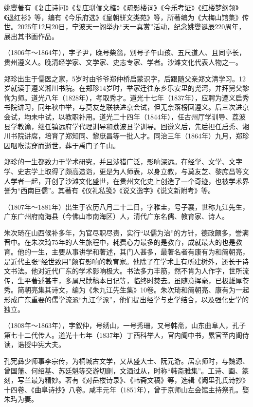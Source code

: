 \begin{description}
        姚燮著有《复庄诗问》《复庄骈俪文榷》《疏影楼词》《今乐考证》《红楼梦纲领》《退红衫》等，编有《今乐府选》《皇朝骈文类苑》等，所著编为《大梅山馆集》传世。2025年12月20日，宁波天一阁举办“天一真赏”活动，纪念姚燮诞辰220周年，展出其书画作品。
  \item[郑珍] （1806年～1864年），字子尹，晚号柴翁，别号子午山孩、五尺道人、且同亭长，贵州遵义人。晚清经学家、文学家、史志专家、学者。沙滩文化代表人物之一。\par
        郑珍出生于儒医之家，5岁时由爷爷郑仲桥启蒙识字，后跟随父亲郑文清学习。12岁就读于遵义湘川书院。在郑珍14岁时，举家迁往东乡乐安里的尧湾，并拜舅父黎恂为师。道光八年（1828年），考取秀才。道光十七年（1837年），应聘为遵义启秀书院讲习，同年秋中举，与莫友芝联袂进京会试，但无奈落榜回遵义。后三次进京会试，均未中试，以教职补用。道光二十四年（1844年），任古州厅学训导、荔波县学教谕，继任镇远府学代理训导和荔波县学训导。回遵义后，先后担任启秀、湘川书院讲席，培育了郑知同、黎庶昌等一批人才。同治三年（1864年）九月，郑珍因咽喉溃穿而逝世，葬于禹门子午山。\par
        郑珍的一生都致力于学术研究，并且涉猎广泛，影响深远。在经学、文学、文字学、史志学上取得了颇高造诣，更是为人师表，以身立教，与莫友芝、黎庶昌等文人学者一起，开创了沙滩文化盛世，在贵州文化史上创造了一个奇迹，也被学术界誉为“西南巨儒”。其著有《仪礼私笺》《说文逸字》《说文新附考》等。
  \item[朱次琦] （1807年～1881年）出生于农历八月二十二日，字稚圭，号子襄，世称九江先生，广东广州府南海县（今佛山市南海区）人，清代广东名儒、教育家、诗人。\par
        朱次琦在山西候补多年，为官尽职尽责，实行“以儒为治”的方针，德政颇多，誉满晋中。在朱次琦75年的人生旅程中，耗费心力最多的是教育，成就最大的也是教育。他的一生，主要从事讲学和著述，其门人甚多，最著名者有康有为和简朝亮，是近代主张“经世致用”颇有影响的教育家。他除了在学术上有所建树外，还长于诗文书法。他对近代广东的学术影响极大。书法多力丰筋，然不肯为人作字，世所流传，生平著述甚丰，多属尺牍稿本日记等，临终时焚去。虽随意挥毫，已极雄厚苍秀。简朝亮集其诗文，编为《朱九江先生集》10卷。朱次琦和简朝亮、康有为一起形成广东重要的儒学流派“九江学派”，他们提出经学与史学结合，以及强化史学的独立。
  \item[孔宪彝] （1808年～1863年），字叙仲，号绣山，一号秀珊，又号韩斋，山东曲阜人，孔子第七十二代传人。道光十七年（1837年）丁酉科举人，官内阁中书，累官至内阁侍读，诰授中宪大夫。\par
        孔宪彝少师事李宗传，为桐城古文学，又从盛大士、阮元游。居京师时，与魏源、曾国藩、何绍基、苏廷魁等交游切劘，文酒过从，时称“韩斋雅集”。工诗、画、篆刻，写兰最为精妙。著有《对岳楼诗录》、《韩斋文稿》等，选辑《阙里孔氏诗抄》十四卷、《曲阜诗抄》八卷。咸丰元年（1851年），曾于京师山左会馆主持祭孔。娶朱玙为妻。

\end{description}
